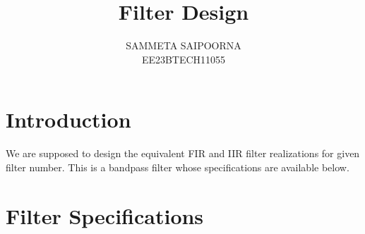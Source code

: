\documentclass{article}
\begin{document}
\title{ \textbf{Filter Design}}

\author{SAMMETA SAIPOORNA \\EE23BTECH11055}
\date{}

\maketitle
\section{Introduction}
We are supposed to design the equivalent FIR and IIR filter realizations for given filter number.  
This is a bandpass filter whose specifications are available below.

\section{Filter Specifications}
\end{document}
